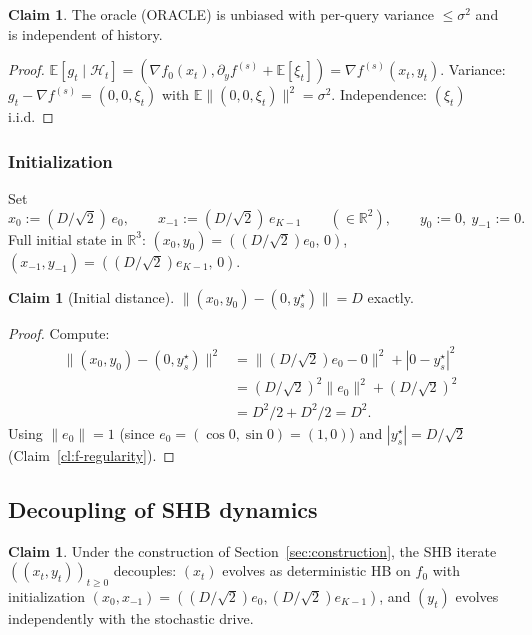 \documentclass[11pt]{article}
\theoremstyle{definition}
\newtheorem{claim}[theorem]{Claim}
\theoremstyle{remark}
\begin{document}
\begin{claim}
\label{cl:oracle}
The oracle (ORACLE) is unbiased with per-query variance $\leq \sigma^2$ and is independent of history.
\end{claim}

\begin{proof}
$\mathbb{E}[g_t \mid \mathcal{H}_t] = (\nabla f_0(x_t), \partial_y f^{(s)} + \mathbb{E}[\xi_t]) = \nabla f^{(s)}(x_t, y_t)$. Variance: $g_t - \nabla f^{(s)} = (0, 0, \xi_t)$ with $\mathbb{E}\|(0,0,\xi_t)\|^2 = \sigma^2$. Independence: $(\xi_t)$ i.i.d.
\end{proof}

\subsubsection{Initialization}

Set
\[
  x_0 := (D/\sqrt 2)\,e_0,\qquad x_{-1} := (D/\sqrt 2)\, e_{K-1}\qquad (\in \mathbb{R}^2),\qquad y_0 := 0,\ y_{-1} := 0.
\]
Full initial state in $\mathbb{R}^3$: $(x_0, y_0) = ((D/\sqrt 2) e_0,\, 0)$, $(x_{-1}, y_{-1}) = ((D/\sqrt 2) e_{K-1},\, 0)$.

\begin{claim}[Initial distance]
\label{cl:initial-distance}
$\|(x_0, y_0) - (0, y^\star_s)\| = D$ exactly.
\end{claim}

\begin{proof}
Compute:
\begin{align*}
\|(x_0, y_0) - (0, y^\star_s)\|^2
&= \|(D/\sqrt 2) e_0 - 0\|^2 + |0 - y^\star_s|^2 \\
&= (D/\sqrt 2)^2 \|e_0\|^2 + (D/\sqrt 2)^2 \\
&= D^2/2 + D^2/2 = D^2.
\end{align*}
Using $\|e_0\| = 1$ (since $e_0 = (\cos 0, \sin 0) = (1, 0)$) and $|y^\star_s| = D/\sqrt 2$ (Claim~\ref{cl:f-regularity}).
\end{proof}

\subsection{Decoupling of SHB dynamics}

\begin{claim}
\label{cl:decoupling}
Under the construction of Section~\ref{sec:construction}, the SHB iterate $((x_t, y_t))_{t\geq 0}$ decouples: $(x_t)$ evolves as deterministic HB on $f_0$ with initialization $(x_0, x_{-1}) = ((D/\sqrt 2) e_0, (D/\sqrt 2) e_{K-1})$, and $(y_t)$ evolves independently with the stochastic drive.
\end{claim}
\end{document}
